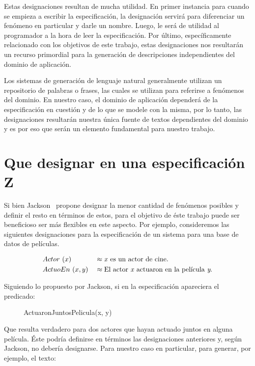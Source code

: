 Estas designaciones resultan de mucha utilidad. En primer instancia para cuando se empieza a escribir la especificación, la designación servirá para diferenciar un fenómeno en particular y darle un nombre. Luego, le será de utilidad al programador a la hora de leer la especificación. Por último, específicamente relacionado con los objetivos de este trabajo, estas designaciones nos resultarán un recurso primordial para la generación de descripciones independientes del dominio de aplicación.

Los sistemas de generación de lenguaje natural generalmente utilizan un repositorio de palabras o frases, las cuales se utilizan para referirse a fenómenos del dominio. En nuestro caso, el dominio de aplicación dependerá de la especificación en cuestión y de lo que se modele con la misma, por lo tanto, las designaciones resultarán nuestra única fuente de textos dependientes del dominio y es por eso que serán un elemento fundamental para nuestro trabajo.

\section{Que designar en una especificación Z}

Si bien Jackson~\cite{jackson} propone designar la menor cantidad de fenómenos posibles y definir el resto en términos de estos, para el objetivo de éste trabajo puede ser beneficioso ser más flexibles en este aspecto. Por ejemplo, consideremos las siguientes designaciones para la especificación de un sistema para una base de datos de películas.

\begin{figure}[H]
  \begin{align*} 
    &Actor~(x) && \approx \text{\emph{x} es un actor de cine.} \\
    &ActuoEn~(x, y) && \approx \text{El actor \emph{x} actuaron en la película \emph{y}.} \\
  \end{align*}
  \label{fig:ej_peliculas}
\end{figure}

Siguiendo lo propuesto por Jackson, si en la especificación apareciera el predicado: 

\begin{figure}[H]
\center
ActuaronJuntosPelicula(x, y)
\end{figure}

Que resulta verdadero para dos actores que hayan actuado juntos en alguna película. Éste podría definirse en términos las designaciones anteriores y, según Jackson, no debería designarse. Para nuestro caso en particular, para generar, por ejemplo, el texto:

